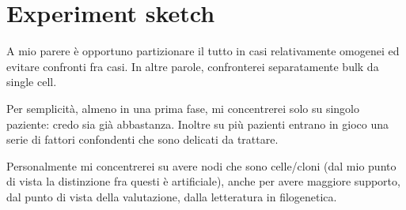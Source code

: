 \documentclass{article}
\begin{document}
\section{Experiment sketch}

A mio parere è opportuno partizionare il tutto in casi relativamente
omogenei ed evitare confronti fra casi. In altre parole, confronterei
separatamente bulk da single cell.

Per semplicità, almeno in una prima fase, mi concentrerei solo su
singolo paziente: credo sia già abbastanza. Inoltre su più pazienti
entrano in gioco una serie di fattori confondenti che sono delicati da
trattare.

Personalmente mi concentrerei su avere nodi che sono celle/cloni (dal
mio punto di vista la distinzione fra questi è artificiale), anche per
avere maggiore supporto, dal punto di vista della valutazione, dalla
letteratura in filogenetica.
\end{document}
